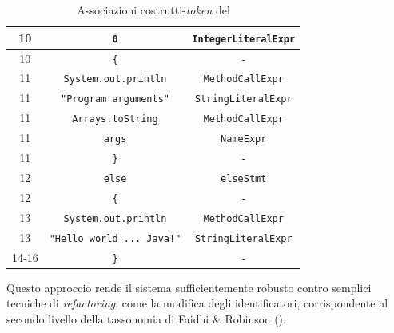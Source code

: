 \begin{table}[h!]
\begin{tabular}{|c|c|c|}
        10  & \texttt{0}                          & \texttt{IntegerLiteralExpr}           \\ \hline
        10  & \texttt{\{}                         & \texttt{-}                            \\ \hline
        11  & \texttt{System.out.println}         & \texttt{MethodCallExpr}               \\ \hline
        11  & \texttt{"Program arguments"}        & \texttt{StringLiteralExpr}            \\ \hline
        11  & \texttt{Arrays.toString}            & \texttt{MethodCallExpr}               \\ \hline
        11  & \texttt{args}                       & \texttt{NameExpr}                     \\ \hline
        11  & \texttt{\}}                         & \texttt{-}                            \\ \hline
        12  & \texttt{else}                       & \texttt{elseStmt}                     \\ \hline
        12  & \texttt{\{}                         & \texttt{-}                            \\ \hline
        13  & \texttt{System.out.println}         & \texttt{MethodCallExpr}               \\ \hline
        13  & \texttt{"Hello world ... Java!"}    & \texttt{StringLiteralExpr}            \\ \hline
        14-16  & \texttt{\}}                         & \texttt{-}                            \\ \hline
    \end{tabular}
    \caption{Associazioni costrutti-\textit{token} del }
    \label{table:token-associations}
\end{table}

Questo approccio rende il sistema sufficientemente robusto contro semplici tecniche di \textit{refactoring}, come la modifica degli identificatori, corrispondente al secondo livello della tassonomia di Faidhi \& Robinson ().

